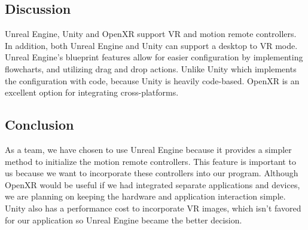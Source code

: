 \documentclass[onecolumn, draftclsnofoot, 10pt, compsoc]{IEEEtran}
\begin{document}
\subsection{Discussion}
\begin{singlespace}
Unreal Engine, Unity and OpenXR support VR and motion remote controllers. In addition, both Unreal Engine and Unity can support a desktop to VR mode. Unreal Engine’s blueprint features allow for easier configuration by implementing flowcharts, and utilizing drag and drop actions. Unlike Unity which implements the configuration with code, because Unity is heavily code-based. OpenXR is an excellent option for integrating cross-platforms. 
\end{singlespace}

\subsection{Conclusion}
\begin{singlespace}
As a team, we have chosen to use Unreal Engine because it provides a simpler method to initialize the motion remote controllers. This feature is important to us because we want to incorporate these controllers into our program. Although OpenXR would be useful if we had integrated separate applications and devices, we are planning on keeping the hardware and application interaction simple. Unity also has a performance cost to incorporate VR images, which isn’t favored for our application so Unreal Engine became the better decision.   
\end{singlespace}

\newpage
\end{document}
